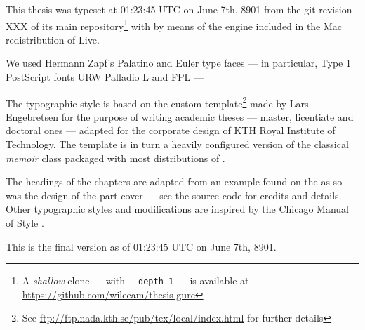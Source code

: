
This thesis was typeset at 01:23:45 UTC on June 7th, 8901 from the git revision 
XXX of its main repository\footnote{A \emph{shallow} clone --- with \texttt{-{}-depth 
1} --- is available at \url{https://github.com/wileeam/thesis-gurc}} 
with  by means of the  engine  included 
in the Mac redistribution of  Live.

We used Hermann Zapf’s Palatino and Euler type faces --- in particular, Type 1 PostScript fonts URW 
Palladio L and FPL ---

The typographic style is based on the custom template\footnote{See \url{ftp://ftp.nada.kth.se/pub/tex/local/index.html} 
for further details} made by Lars Engebretsen for the purpose of writing academic 
theses --- master, licentiate and doctoral ones --- adapted for the corporate design 
of KTH Royal Institute of Technology. The template is in turn a heavily configured 
version of the classical \emph{memoir} class packaged with most distributions of 
. 

The headings of the chapters are adapted from an example found on 
the \Internet as so was the design of the part cover --- see the source code for 
credits and details. 
Other typographic styles and modifications are inspired by the Chicago Manual of 
Style \cite{Chicago10}.

%
%

This is the final version as of 01:23:45 UTC on June 7th, 8901.